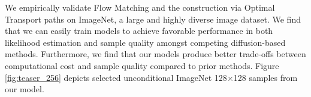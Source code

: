 \documentclass{article}
\makeatletter
\newcommand{\yl}[1]{{\color{magenta}{\bf[Yaron:} #1{\bf]}}}
\newcommand{\eg}{{e.g.}}
\renewcommand*{\eg}{{\it e.g.}\@\xspace}
\makeatother
\begin{document}
We empirically validate Flow Matching and the construction via Optimal Transport paths on ImageNet, a large and highly diverse image dataset. We find that we can easily train models to achieve favorable performance in both likelihood estimation and sample quality amongst competing diffusion-based methods. Furthermore, we find that our models produce better trade-offs between computational cost and sample quality compared to prior methods. Figure \ref{fig:teaser_256} depicts selected unconditional ImageNet 128$\times$128 samples from our model. 



\end{document}
